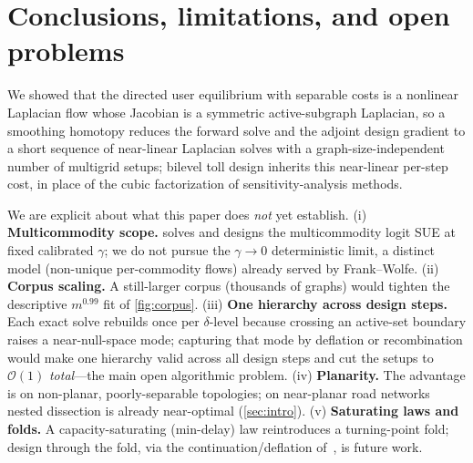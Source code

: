 \documentclass[ijoc]{informs3}
\begin{document}
\section{Conclusions, limitations, and open problems}\label{sec:conclusion}
We showed that the directed user equilibrium with separable costs is a nonlinear Laplacian flow whose Jacobian
is a symmetric active-subgraph Laplacian, so a smoothing homotopy reduces the forward solve and the adjoint
design gradient to a short sequence of near-linear Laplacian solves with a graph-size-independent number of
multigrid setups; bilevel toll design inherits this near-linear per-step cost, in place of the cubic
factorization of sensitivity-analysis methods.

We are explicit about what this paper does \emph{not} yet establish. (i) \textbf{Multicommodity scope.}
 solves and designs the multicommodity logit SUE at fixed calibrated $\gamma$; we do not pursue the
$\gamma\to0$ deterministic limit, a distinct model (non-unique per-commodity flows) already served by
Frank--Wolfe. (ii) \textbf{Corpus scaling.} A still-larger corpus (thousands of graphs) would tighten the
descriptive $m^{0.99}$ fit of \cref{fig:corpus}. (iii) \textbf{One hierarchy across design steps.} Each exact
solve rebuilds once per $\delta$-level because crossing an active-set boundary raises a near-null-space mode;
capturing that mode by deflation or recombination would make one hierarchy valid across all design steps and cut
the setups to $\mathcal{O}(1)$ \emph{total}---the main open algorithmic problem. (iv) \textbf{Planarity.} The
advantage is on non-planar, poorly-separable topologies; on near-planar road networks nested dissection is
already near-optimal (\cref{sec:intro}). (v) \textbf{Saturating laws and folds.} A capacity-saturating
(min-delay) law reintroduces a turning-point fold; design through the fold, via the continuation/deflation
of~\citet{nlf}, is future work.

\end{document}
